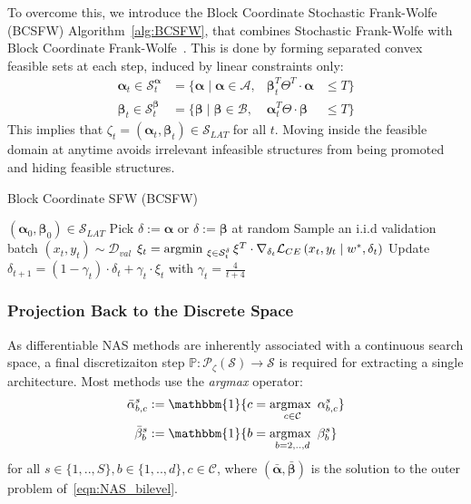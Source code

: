 \documentclass[dvipsnames,table,xcdraw]{article}
\newcommand{\argmax}{\operatornamewithlimits{argmax~}}
\newcommand{\argmin}{\operatornamewithlimits{argmin~}}
\newcommand{\balpha}{\bm{\alpha}}
\newcommand{\bbeta}{\bm{\beta}}
\begin{document}
To overcome this, we introduce the Block Coordinate Stochastic Frank-Wolfe (BCSFW) Algorithm~\ref{alg:BCSFW}, that combines Stochastic Frank-Wolfe with Block Coordinate Frank-Wolfe~\cite{BCFW}. This is done by forming separated convex feasible sets at each step, induced by linear constraints only:
\begin{align}
    \label{eqn:alpha_search_space}
 \balpha_t \in \mathcal{S}^{\balpha}_t&=\{\balpha\mid \balpha\in \mathcal{A},& \bbeta_t^T \Theta^T \cdot \balpha&\leq T\}
 \\
    \label{eqn:beta_search_space}
 \bbeta_t \in \mathcal{S}^{\bbeta}_t&=\{\bbeta\mid \bbeta\in \mathcal{B},& \balpha_t^T \Theta \cdot \bbeta&\leq T\}
\end{align}
 This implies that $\zeta_t=(\balpha_t, \bbeta_t)\in\mathcal{S}_{LAT}$ for all $t$.
Moving inside the feasible domain at anytime avoids irrelevant infeasible structures from being promoted and hiding feasible structures.
\vspace{1em}
\begin{algorithm}[htb]
   \caption{Block Coordinate SFW (BCSFW)}
   \label{alg:BCSFW}
\begin{algorithmic}
\INPUT $(\balpha_0, \bbeta_0) \in \mathcal{S}_{LAT}$
\STATE Pick $\delta:=\balpha$ or $\delta:=\bbeta$ at random
\STATE Sample an i.i.d validation batch $(x_t, y_t)\sim\mathcal{D}_{val}$
\STATE $\xi_t=\argmin_{\xi \in \mathcal{S}^{\delta}_t}\xi^T\cdot \nabla_{\delta_t}\mathcal{L}_{CE}\left(x_t, y_t \mid w^*, \delta_t\right)$
\STATE Update $\delta_{t+1} = (1-\gamma_t)\cdot\delta_t + \gamma_t\cdot\xi_t$ with $\gamma_t=\frac{4}{t+4}$
\ENDFOR
\end{algorithmic}
\end{algorithm}
 








\subsubsection{Projection Back to the Discrete Space}\label{sec:projection}
As differentiable NAS methods are inherently associated with a continuous search space, a final discretizaiton step $\mathbb{P}:\mathcal{P}_\zeta(\mathcal{S})\rightarrow\mathcal{S}$ is required for extracting a single architecture. 
Most methods use the \textit{argmax} operator:
\begin{align}\label{eqn:argmax}
\bar{\alpha}^s_{b,c}&:=\mathbbm{1}\{c=\argmax_{c\in\mathcal{C}}\alpha^s_{b,c}\} 
\\\notag
\bar{\beta}^s_b&:=\mathbbm{1}\{b=\argmax_{b=2,..,d}\beta^s_b\} 
\end{align}
for all $s\in\{1,..,S\}, b\in\{1,..,d\},c\in\mathcal{C}$, where $(\bar{\balpha}, \bar{\bbeta})$ is the solution to the outer problem of~\eqref{eqn:NAS_bilevel}.
\end{document}
